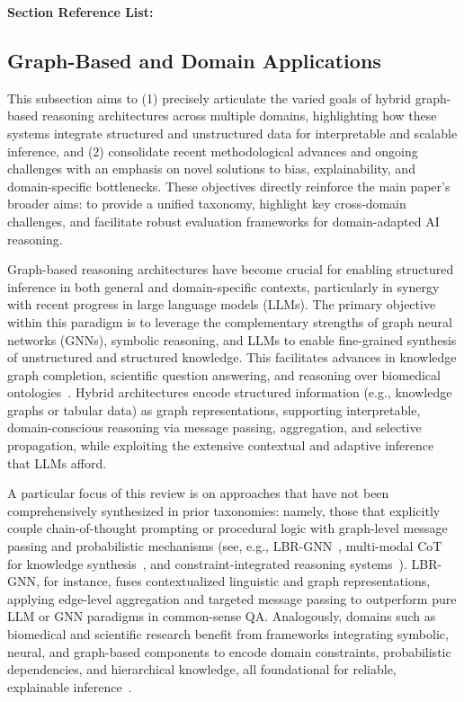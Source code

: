 \documentclass[sigconf]{acmart}
\begin{document}
\textbf{Section Reference List:}~\cite{ref93,ref1,ref10,ref11,ref22,ref42,ref45,ref49,ref54,ref56,ref68,ref86}

\subsection{Graph-Based and Domain Applications}

This subsection aims to (1) precisely articulate the varied goals of hybrid graph-based reasoning architectures across multiple domains, highlighting how these systems integrate structured and unstructured data for interpretable and scalable inference, and (2) consolidate recent methodological advances and ongoing challenges with an emphasis on novel solutions to bias, explainability, and domain-specific bottlenecks. These objectives directly reinforce the main paper’s broader aims: to provide a unified taxonomy, highlight key cross-domain challenges, and facilitate robust evaluation frameworks for domain-adapted AI reasoning.

Graph-based reasoning architectures have become crucial for enabling structured inference in both general and domain-specific contexts, particularly in synergy with recent progress in large language models (LLMs). The primary objective within this paradigm is to leverage the complementary strengths of graph neural networks (GNNs), symbolic reasoning, and LLMs to enable fine-grained synthesis of unstructured and structured knowledge. This facilitates advances in knowledge graph completion, scientific question answering, and reasoning over biomedical ontologies~\cite{ref87,ref88,ref31,ref36,ref46,ref47,ref48,ref49,ref50,ref55,ref60,ref74,ref75,ref80}. Hybrid architectures encode structured information (e.g., knowledge graphs or tabular data) as graph representations, supporting interpretable, domain-conscious reasoning via message passing, aggregation, and selective propagation, while exploiting the extensive contextual and adaptive inference that LLMs afford.

A particular focus of this review is on approaches that have not been comprehensively synthesized in prior taxonomies: namely, those that explicitly couple chain-of-thought prompting or procedural logic with graph-level message passing and probabilistic mechanisms (see, e.g., LBR-GNN~\cite{ref87}, multi-modal CoT for knowledge synthesis~\cite{ref88}, and constraint-integrated reasoning systems~\cite{ref89,ref49}). LBR-GNN, for instance, fuses contextualized linguistic and graph representations, applying edge-level aggregation and targeted message passing to outperform pure LLM or GNN paradigms in common-sense QA. Analogously, domains such as biomedical and scientific research benefit from frameworks integrating symbolic, neural, and graph-based components to encode domain constraints, probabilistic dependencies, and hierarchical knowledge, all foundational for reliable, explainable inference~\cite{ref31,ref36,ref46,ref47,ref48,ref49,ref50,ref55,ref60,ref74,ref75,ref80,ref87,ref88}.
\end{document}
